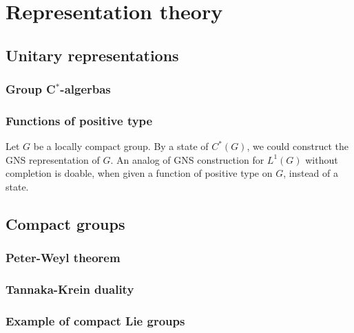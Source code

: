 \documentclass{../note}
\begin{document}
\part{Representation theory}
\chapter{Unitary representations}
\section{}
\begin{prb}
\end{prb}
\section{Group C$^*$-algerbas}
\begin{prb}
\end{prb}
\section{Functions of positive type}
\begin{prb}
\end{prb}
\begin{prb}
\end{prb}
\begin{prb}
Let $G$ be a locally compact group.
By a state of $C^*(G)$, we could construct the GNS representation of $G$.
An analog of GNS construction for $L^1(G)$ without completion is doable, when given a function of positive type on $G$, instead of a state.
\end{prb}


\chapter{Compact groups}
\section{Peter-Weyl theorem}
\section{Tannaka-Krein duality}
\section{Example of compact Lie groups}
\end{document}
